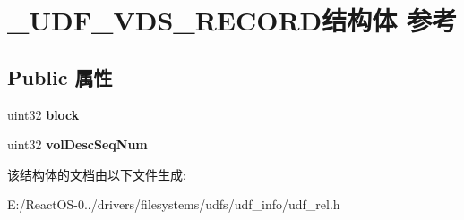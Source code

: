 \hypertarget{struct___u_d_f___v_d_s___r_e_c_o_r_d}{}\section{\+\_\+\+U\+D\+F\+\_\+\+V\+D\+S\+\_\+\+R\+E\+C\+O\+R\+D结构体 参考}
\label{struct___u_d_f___v_d_s___r_e_c_o_r_d}
\subsection*{Public 属性}
\begin{DoxyCompactItemize}
\item 
\mbox{\label{struct___u_d_f___v_d_s___r_e_c_o_r_d_ad324ceb2e993989ef5fec38fe54081d8}} 
uint32 {\bfseries block}
\item 
\mbox{\label{struct___u_d_f___v_d_s___r_e_c_o_r_d_a0d84fc013de823f6f5ebd737768df002}} 
uint32 {\bfseries vol\+Desc\+Seq\+Num}
\end{DoxyCompactItemize}


该结构体的文档由以下文件生成\+:\begin{DoxyCompactItemize}
\item 
E\+:/\+React\+O\+S-\/0../drivers/filesystems/udfs/udf\+\_\+info/udf\+\_\+rel.\+h\end{DoxyCompactItemize}
